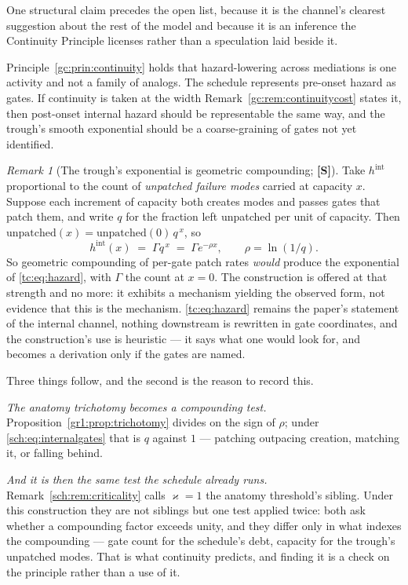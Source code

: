 \documentclass[11pt]{article}
\numberwithin{equation}{section}
\theoremstyle{plain}
\theoremstyle{definition}
\theoremstyle{remark}
\newtheorem{remark}[theorem]{Remark}
\begin{document}
One structural claim precedes the open list, because it is
the channel's clearest suggestion about the rest of the model and because
it is an inference the Continuity Principle licenses rather than a
speculation laid beside it.

Principle~\ref{gc:prin:continuity} holds that hazard-lowering across
mediations is one activity and not a family of analogs. The schedule
represents pre-onset hazard as gates. If continuity is taken at the width
Remark~\ref{gc:rem:continuitycost} states it, then post-onset internal
hazard should be representable the same way, and the trough's smooth
exponential should be a coarse-graining of gates not yet identified.

\begin{remark}[The trough's exponential is geometric compounding;
\textbf{[S]}]\label{sch:rem:internalgates}
Take $h^{\mathrm{int}}$ proportional to the count of \emph{unpatched
failure modes} carried at capacity $x$. Suppose each increment of
capacity both creates modes and passes gates that patch them, and write
$q$ for the fraction left unpatched per unit of capacity. Then
$\text{unpatched}(x)=\text{unpatched}(0)\,q^{\,x}$, so
\begin{equation}\label{sch:eq:internalgates}
h^{\mathrm{int}}(x)\;=\;\Gamma q^{\,x}\;=\;\Gamma e^{-\rho x},
\qquad \rho=\ln(1/q).
\end{equation}
So geometric compounding of per-gate patch rates \emph{would} produce
the exponential of \eqref{tc:eq:hazard}, with $\Gamma$ the count at
$x=0$. The construction is offered at that strength and no more: it
exhibits a mechanism yielding the observed form, not evidence that this
is the mechanism. \eqref{tc:eq:hazard} remains the paper's statement of
the internal channel, nothing downstream is rewritten in gate
coordinates, and the construction's use is heuristic --- it says what one
would look for, and becomes a derivation only if the gates are named.

Three things follow, and the second is the reason to record this.

\emph{The anatomy trichotomy becomes a compounding test.}
Proposition~\ref{gr1:prop:trichotomy} divides on the sign of $\rho$;
under \eqref{sch:eq:internalgates} that is $q$ against $1$ --- patching
outpacing creation, matching it, or falling behind.

\emph{And it is then the same test the schedule already runs.}
Remark~\ref{sch:rem:criticality} calls $\varkappa=1$ the anatomy threshold's
sibling. Under this construction they are not siblings but one test
applied twice: both ask whether a compounding factor exceeds unity, and
they differ only in what indexes the compounding --- gate count for the
schedule's debt, capacity for the trough's unpatched modes. That is what
continuity predicts, and finding it is a check on the principle rather
than a use of it.


\end{remark}
\end{document}
